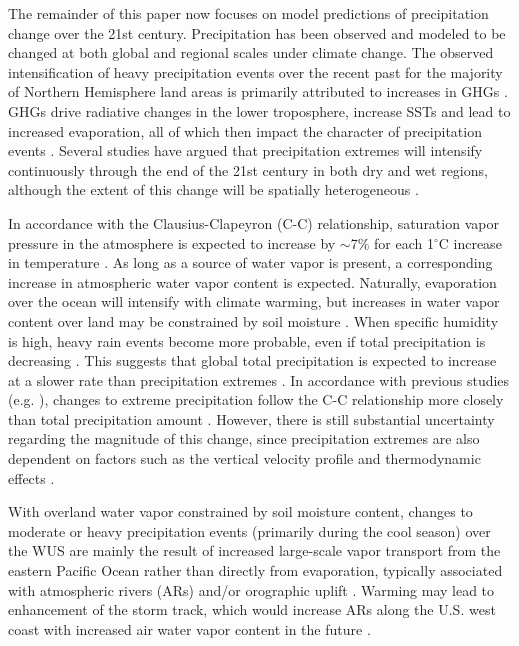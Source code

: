 \documentclass{ametsoc}
\begin{document}
The remainder of this paper now focuses on model predictions of precipitation change over the 21st century.  Precipitation has been observed and modeled to be changed at both global and regional scales under climate change. The observed intensification of heavy precipitation events over the recent past for the majority of Northern Hemisphere land areas is primarily attributed to increases in GHGs \citep{min2011human}.  GHGs drive radiative changes in the lower troposphere, increase SSTs and lead to increased evaporation, all of which then impact the character of precipitation events \citep{allen2002constraints, sugi2004mechanism}. Several studies have argued that precipitation extremes will intensify continuously through the end of the 21st century in both dry and wet regions, although the extent of this change will be spatially heterogeneous \citep{donat2016more}.


In accordance with the Clausius-Clapeyron (C-C) relationship, saturation vapor pressure in the atmosphere is expected to increase by $\sim$7$\%$ for each 1$^\circ$C increase in temperature \citep{allan2008atmospheric}.  As long as a source of water vapor is present, a corresponding increase in atmospheric water vapor content is expected.  Naturally, evaporation over the ocean will intensify with climate warming, but increases in water vapor content over land may be constrained by soil moisture \citep{cayan2010future}. When specific humidity is high, heavy rain events become more probable, even if total precipitation is decreasing \citep{allen2002constraints, trenberth2011changes}. This suggests that global total precipitation is expected to increase at a slower rate than precipitation extremes \citep{allan2008atmospheric}. In accordance with previous studies (e.g. \cite{allan2008atmospheric, o2009physical, min2011human}), changes to extreme precipitation follow the C-C relationship more closely than total precipitation amount \citep{trenberth2003changing}. However, there is still substantial uncertainty regarding the magnitude of this change, since precipitation extremes are also dependent on factors such as the vertical velocity profile and thermodynamic effects \citep{o2009physical}.


With overland water vapor constrained by soil moisture content, changes to moderate or heavy precipitation events (primarily during the cool season) over the WUS are mainly the result of increased large-scale vapor transport from the eastern Pacific Ocean rather than directly from evaporation, typically associated with atmospheric rivers (ARs) and/or orographic uplift \citep{trenberth2003changing, neiman2008meteorological}. Warming may lead to enhancement of the storm track, which would increase ARs along the U.S. west coast with increased air water vapor content in the future \citep{dettinger2011climate, gao2015dynamical}.
\end{document}
